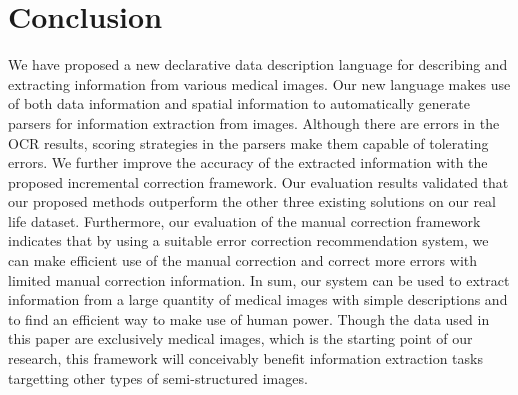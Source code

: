 \section{Conclusion}
\label{sec:conclude}
We have proposed a new declarative 
data description language for describing and extracting 
information from various medical images. 
Our new language makes use of both data information and 
spatial information to automatically 
generate parsers for information extraction from 
images. Although there are errors in the OCR results, 
scoring strategies in the parsers make them capable of 
tolerating errors. 
We further improve the accuracy of the 
extracted information with the proposed incremental correction framework. 
Our evaluation results validated 
that our proposed methods outperform the other three 
existing solutions on our real life dataset. 
Furthermore, our evaluation of the manual correction framework indicates that 
by using a suitable error correction recommendation system, 
we can make efficient use of the manual correction and 
correct more errors with limited manual correction 
information. In sum, our system can be used to extract 
information from a large quantity of medical images with simple 
descriptions and to find an efficient way to make use of 
human power. Though the data used in this paper are exclusively
medical images, which is the starting point of our research, 
this framework will conceivably benefit 
information extraction tasks targetting other types of
semi-structured images.

